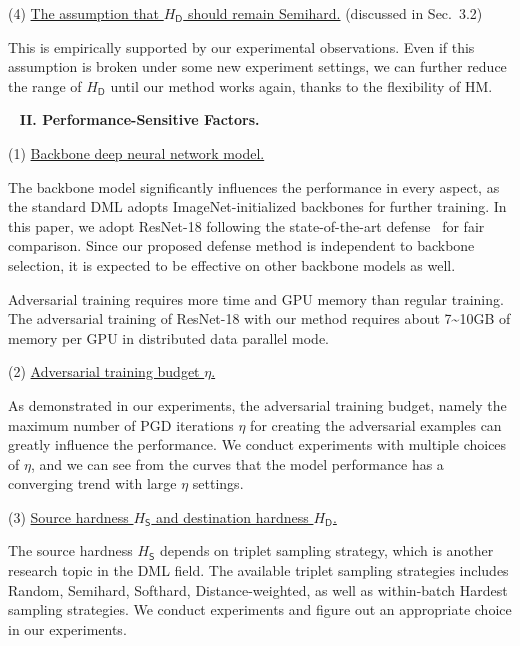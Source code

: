 (4) \ul{The assumption that $H_\mathsf{D}$ should remain Semihard.}
(discussed in Sec.~3.2)

This is empirically supported by our experimental observations.
%
Even if this assumption is broken under some new experiment settings,
we can further reduce the range of $H_\mathsf{D}$ until our method works again,
thanks to the flexibility of HM.

~\newline
\noindent\textbf{II. Performance-Sensitive Factors.}

(1) \ul{Backbone deep neural network model.}

The backbone model significantly influences the performance in every aspect, as
the standard DML adopts ImageNet-initialized backbones for further training.
%
In this paper, we adopt ResNet-18 following the state-of-the-art
defense~\cite{robrank} for fair comparison.
%
Since our proposed defense method is independent to backbone selection, it is
expected to be effective on other backbone models as well.

Adversarial training requires more time and GPU memory than regular training.
%
The adversarial training of ResNet-18 with our method requires about 7\~{}10GB
of memory per GPU in distributed data parallel mode.
%

(2) \ul{Adversarial training budget $\eta$.}

As demonstrated in our experiments, the adversarial training budget, namely the
maximum number of PGD iterations $\eta$ for creating the adversarial examples
can greatly influence the performance.
%
We conduct experiments with multiple choices of $\eta$, and we can see from the
curves that the model performance has a converging trend with large $\eta$
settings.

(3) \ul{Source hardness $H_\mathsf{S}$ and destination hardness
$H_\mathsf{D}$.}

The source hardness $H_\mathsf{S}$ depends on triplet sampling strategy, which
is another research topic in the DML field.
%
The available triplet sampling strategies includes Random, Semihard, Softhard,
Distance-weighted, as well as within-batch Hardest sampling strategies.
%
We conduct experiments and figure out an appropriate choice in our experiments.

